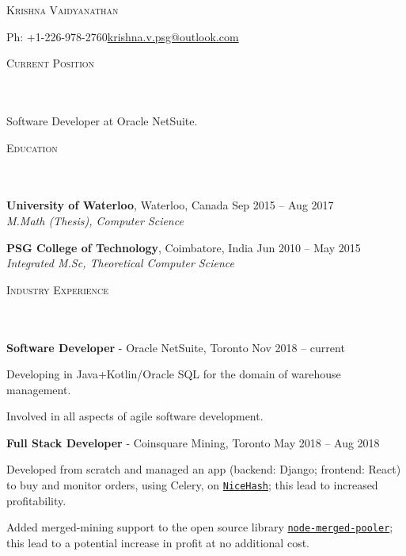 \documentclass{article}
\newcommand{\header}[1]{{
\hspace*{-15pt}\vspace*{6pt} \textsc{#1}} \vspace*{-6pt} 
\lineunder
}
\newcommand{\lineunder}{
\vspace*{-8pt} \\ \hspace*{-18pt} 
\hrulefill \\
}
\newcommand{\content}{
\vspace*{2pt}%
}
\newcommand{\college}[5]{\vspace*{2pt}%
#1 \hfill #2 \\ #3 \hfill #4
\vspace*{5pt}
}
\newcommand{\employer}[4]{{
\vspace*{2pt}%
\textbf{#1} - #2 \hfill #3\\ #4 \vspace*{2pt}}
}
\renewcommand{\labelitemii}{
$\vcenter{\hbox{\tiny$\bullet$}}$\hspace*{-3pt}
}
\newenvironment{bullet-list-minor}{
\begin{list}{\labelitemii}{\setlength\leftmargin{15pt} 
\topsep 0pt \itemsep -2pt}}{\vspace*{4pt}\end{list}
}
\begin{document}
\small
\smallskip
\vspace*{-65pt}

\begin{center}
    {\large \scshape{Krishna Vaidyanathan}}
\end{center}
    Ph: +1-226-978-2760\hfill \href{mailto:krishna.v.psg@outlook.com}{krishna.v.psg@outlook.com} \\
\vspace{15pt}

\header{Current Position}
    \content{Software Developer at Oracle NetSuite.}


\vspace*{4pt}%
\header{Education}
    \college{\textbf{University of Waterloo}, Waterloo, Canada}{Sep 2015 -- Aug 2017}
    {\textit{M.Math (Thesis), Computer Science}}{}\\

    \college{\textbf{PSG College of Technology}, Coimbatore, India}{Jun 2010 -- May 2015}
    {\textit{Integrated M.Sc, Theoretical Computer Science}}{}\\

\vspace*{4pt}%
\header{Industry Experience}
  \employer{Software Developer}{Oracle NetSuite,
        Toronto}{Nov 2018 -- current}{}
	\begin{bullet-list-minor}
	\item Developing in Java+Kotlin/Oracle SQL for the domain of warehouse management.
	\item Involved in all aspects of agile software development.
    \end{bullet-list-minor}

    \employer{Full Stack Developer}{Coinsquare Mining,
        Toronto}{May 2018 -- Aug 2018}{}
	\begin{bullet-list-minor}
	\item Developed from scratch and managed an app (backend: Django; frontend: React) to buy and monitor
orders, using Celery, on \texttt{\href{www.nicehash.com}{NiceHash}};  this lead to increased profitability. 
	\item Added merged-mining support to the open source library \texttt{\href{https://github.com/UNOMP/node-merged-pool}{node-merged-pooler}}; this lead to a potential increase in profit at no additional cost.
    \end{bullet-list-minor}
\end{document}
